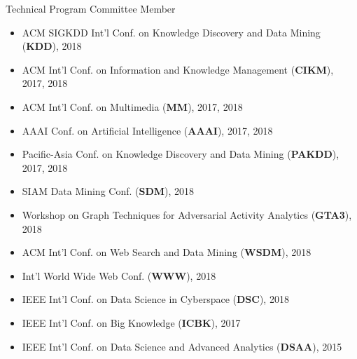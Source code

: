 \documentclass[margin, 9pt]{res}
\begin{document}
\begin{resume}
{Technical Program Committee Member}
\begin{itemize}
\item ACM SIGKDD Int'l Conf. on Knowledge Discovery and Data Mining (\textbf{KDD}), 2018		
\item ACM Int'l Conf. on Information and Knowledge Management (\textbf{CIKM}), 2017, 2018
\item ACM Int'l Conf. on Multimedia (\textbf{MM}), 2017, 2018
\item AAAI Conf. on Artificial Intelligence (\textbf{AAAI}), 2017, 2018
\item Pacific-Asia Conf. on Knowledge Discovery and Data Mining (\textbf{PAKDD}), 2017, 2018
\item SIAM Data Mining Conf. (\textbf{SDM}), 2018
\item Workshop on Graph Techniques for Adversarial Activity Analytics (\textbf{GTA3}), 2018
\item ACM Int'l Conf. on Web Search and Data Mining (\textbf{WSDM}), 2018
\item Int'l World Wide Web Conf. (\textbf{WWW}), 2018
\item IEEE Int'l Conf. on Data Science in Cyberspace (\textbf{DSC}), 2018
\item IEEE Int'l Conf. on Big Knowledge (\textbf{ICBK}), 2017
\item IEEE Int'l Conf. on Data Science and Advanced Analytics (\textbf{DSAA}), 2015
\end{itemize}
\vspace{-0.1in}


\end{resume}
\end{document}
